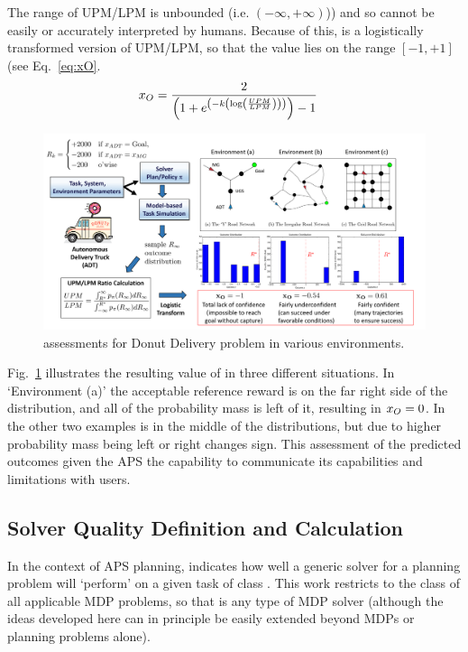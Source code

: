 The range of UPM/LPM is unbounded (i.e. $(-\infty,+\infty)$)) and so cannot be easily or accurately interpreted by humans. Because of this, \xO{} is a logistically transformed version of UPM/LPM, so that the value lies on the range $[-1,+1]$ (see Eq.~\ref{eq:xO}.
    \begin{align}
        \xO &= \frac{2}{\left(1+e^{\left(-k\left(\log\left(\frac{UPM}{LPM}\right)\right)\right)}\right) - 1} \label{eq:xO}
    \end{align}
    \begin{figure}[tbp]
        \centering
        \includegraphics[width=0.95\linewidth]{Figures/xO_FullADT.png}
        \caption{\xO{} assessments for Donut Delivery problem in various environments. }
        \label{fig:xOexample}
    \end{figure}

Fig.~\ref{fig:xOexample} illustrates the resulting value of \xO{} in three different situations. In `Environment (a)' the acceptable reference reward \ris{} is on the far right side of the distribution, and all of the probability mass is left of it, resulting in $x_O=0$. In the other two examples \ris{} is in the middle of the distributions, but due to higher probability mass being left or right \xO{} changes sign. This assessment of the predicted outcomes given the APS the capability to communicate its capabilities and limitations with users.

\subsection{Solver Quality Definition and Calculation} \label{sec:xQ}
In the context of APS planning, \xQ{} indicates how well a generic solver \solve{} for a planning problem will `perform' on a given task \task{} of class \taskclass{}. This work restricts \taskclass{} to the class of all applicable MDP problems, so that \solve{} is any type of MDP solver  (although the ideas developed here can in principle be easily extended beyond MDPs or planning problems alone).

